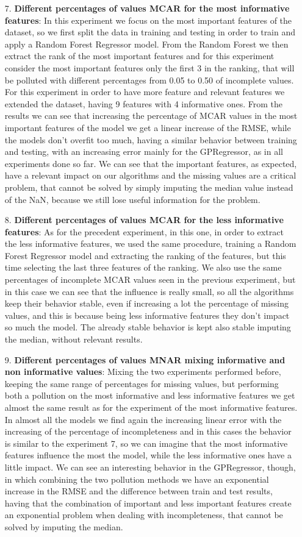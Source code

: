 \documentclass{Configuration_Files/PoliMi3i_thesis}
\begin{document}
\begin{enumerate}
\item[7.] \textbf{Different percentages of values MCAR for the most informative features}: In this experiment we focus on the most important features of the dataset, so we first split the data in training and testing in order to train and apply a Random Forest Regressor model. From the Random Forest we then extract the rank of the most important features and for this experiment consider the most important features only the first 3 in the ranking, that will be polluted with different percentages from 0.05 to 0.50 of incomplete values. For this experiment in order to have more feature and relevant features we extended the dataset, having 9 features with 4 informative ones. From the results we can see that increasing the percentage of MCAR values in the most important features of the model we get a linear increase of the RMSE, while the models don't overfit too much, having a similar behavior between training and testing, with an increasing error mainly for the GPRegressor, as in all experiments done so far. We can see that the important features, as expected, have a relevant impact on our algorithms and the missing values are a critical problem, that cannot be solved by simply imputing the median value instead of the NaN, because we still lose useful information for the problem. 
\item[8.] \textbf{Different percentages of values MCAR for the less informative features}: As for the precedent experiment, in this one, in order to extract the less informative features, we used the same procedure, training a Random Forest Regressor model and extracting the ranking of the features, but this time selecting the last three features of the ranking. We also use the same percentages of incomplete MCAR values seen in the previous experiment, but in this case we can see that the influence is really small, so all the algorithms keep their behavior stable, even if increasing a lot the percentage of missing values, and this is because being less informative features they don't impact so much the model. The already stable behavior is kept also stable imputing the median, without relevant results.
\item[9.] \textbf{Different percentages of values MNAR mixing informative and non informative values}: Mixing the two experiments performed before, keeping the same range of percentages for missing values, but performing both a pollution on the most informative and less informative features we get almost the same result as for the experiment of the most informative features. In almost all the models we find again the increasing linear error with the increasing of the percentage of incompleteness and in this cases the behavior is similar to the experiment 7, so we can imagine that the most informative features influence the most the model, while the less informative ones have a little impact. We can see an interesting behavior in the GPRegressor, though, in which combining the two pollution methods we have an exponential increase in the RMSE and the difference between train and test results, having that the combination of important and less important features create an exponential problem when dealing with incompleteness, that cannot be solved by imputing the median. 

\end{enumerate}
\end{document}
